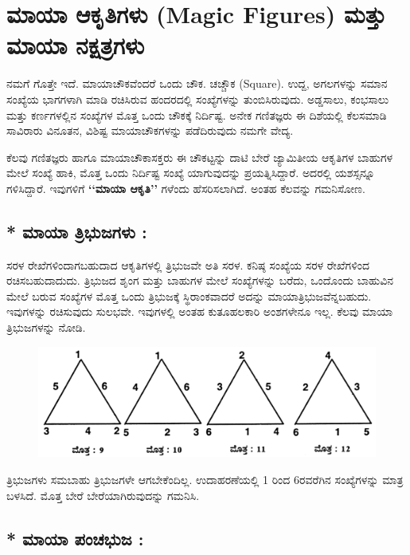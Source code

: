 
\chapter{ಮಾಯಾ ಆಕೃತಿಗಳು (Magic Figures) ಮತ್ತು ಮಾಯಾ ನಕ್ಷತ್ರಗಳು}

ನಮಗೆ ಗೊತ್ತೇ ಇದೆ. ಮಾಯಾಚೌಕವೆಂದರೆ ಒಂದು ಚೌಕ. ಚಚ್ಚೌಕ (Square). ಉದ್ದ, ಅಗಲ\-ಗಳನ್ನು ಸಮಾನ ಸಂಖ್ಯೆಯ ಭಾಗಗಳಾಗಿ ಮಾಡಿ ರಚಿಸಿರುವ ಹಂದರದಲ್ಲಿ ಸಂಖ್ಯೆ\-ಗಳನ್ನು ತುಂಬಿಸಿರುವುದು. ಅಡ್ಡಸಾಲು, ಕಂಭಸಾಲು ಮತ್ತು ಕರ್ಣಗಳಲ್ಲಿನ ಸಂಖ್ಯೆಗಳ ಮೊತ್ತ ಒಂದು ಚೌಕಕ್ಕೆ ನಿರ್ದಿಷ್ಟ. ಅನೇಕ ಗಣಿತಜ್ಞರು ಈ ದಿಶೆಯಲ್ಲಿ ಕೆಲಸಮಾಡಿ ಸಾವಿರಾರು ವಿನೂತನ, ವಿಶಿಷ್ಟ ಮಾಯಾಚೌಕಗಳನ್ನು ಪಡೆದಿರುವುದು ನಮಗೇ ವೇದ್ಯ.

ಕೆಲವು ಗಣಿತಜ್ಞರು ಹಾಗೂ ಮಾಯಾಚೌಕಾಸಕ್ತರು ಈ ಚೌಕಟ್ಟನ್ನು ದಾಟಿ ಬೇರೆ \hbox{ಜ್ಯಾಮಿತೀಯ} ಆಕೃತಿಗಳ ಬಾಹುಗಳ ಮೇಲೆ ಸಂಖ್ಯೆ ಹಾಕಿ, ಮೊತ್ತ ಒಂದು ನಿರ್ದಿಷ್ಟ ಸಂಖ್ಯೆ ಯಾಗುವುದನ್ನು ಪ್ರಯತ್ನಿಸಿದ್ದಾರೆ. ಅದರಲ್ಲಿ ಯಶಸ್ಸನ್ನೂ ಗಳಿಸಿದ್ದಾರೆ. ಇವುಗಳಿಗೆ \break \textbf{‘‘ಮಾಯಾ ಆಕೃತಿ’’} ಗಳೆಂದು ಹೆಸರಿಸಲಾಗಿದೆ. ಅಂತಹ ಕೆಲವನ್ನು ಗಮನಿಸೋಣ.

\section*{* ಮಾಯಾ ತ್ರಿಭುಜಗಳು :}

ಸರಳ ರೇಖೆಗಳಿಂದಾಗಬಹುದಾದ ಆಕೃತಿಗಳಲ್ಲಿ ತ್ರಿಭುಜವೇ ಅತಿ ಸರಳ. ಕನಿಷ್ಠ ಸಂಖ್ಯೆಯ ಸರಳ ರೇಖೆಗಳಿಂದ ರಚಿಸಬಹುದಾದುದು. ತ್ರಿಭುಜದ ಶೃಂಗ ಮತ್ತು ಬಾಹುಗಳ ಮೇಲೆ ಸಂಖ್ಯೆ\-ಗಳನ್ನು ಬರೆದು, ಒಂದೊಂದು ಬಾಹುವಿನ ಮೇಲೆ ಬರುವ ಸಂಖ್ಯೆಗಳ ಮೊತ್ತ ಒಂದು \hbox{ತ್ರಿಭುಜಕ್ಕೆ} ಸ್ಥಿರಾಂಕವಾದರೆ ಅದನ್ನು ಮಾಯಾತ್ರಿಭುಜವೆನ್ನಬಹುದು. ಇವುಗಳನ್ನು ರಚಿಸು\-ವುದು ಸುಲಭವೇ. ಇವುಗಳಲ್ಲಿ ಅಂತಹ ಕುತೂಹಲಕಾರಿ ಅಂಶಗಳೇನೂ ಇಲ್ಲ. ಕೆಲವು \hbox{ಮಾಯಾ} ತ್ರಿಭುಜಗಳನ್ನು ನೋಡಿ.
\begin{figure}[H]
\includegraphics[scale=.8]{src/figures/chap8/fig8-1.jpg}
\end{figure}

ತ್ರಿಭುಜಗಳು ಸಮಬಾಹು ತ್ರಿಭುಜಗಳೇ ಆಗಬೇಕೆಂದಿಲ್ಲ. ಉದಾಹರಣೆಯಲ್ಲಿ 1 ರಿಂದ 6ರವರೆಗಿನ ಸಂಖ್ಯೆಗಳನ್ನು ಮಾತ್ರ ಬಳಸಿದೆ. ಮೊತ್ತ ಬೇರೆ ಬೇರೆಯಾಗಿರುವುದನ್ನು ಗಮನಿಸಿ.

\section*{* ಮಾಯಾ ಪಂಚಭುಜ :}

